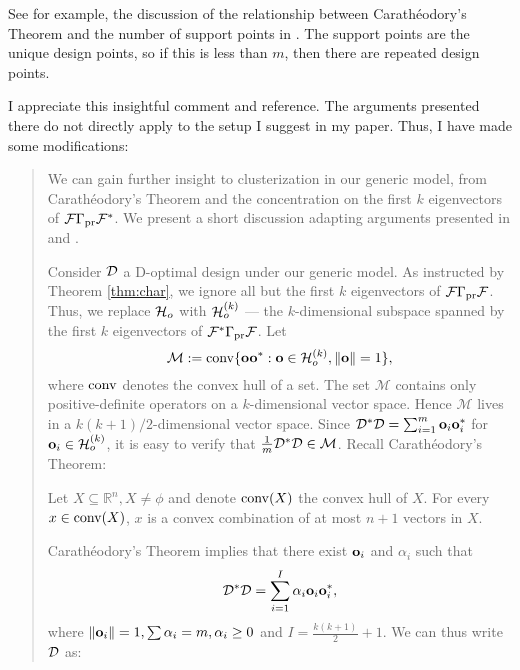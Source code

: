 \RC See for example, the discussion of the relationship between
Carath\'eodory’s Theorem and the number of support points in \cite[page
  139]{pronzatoPazman2013}. The support points are the unique design
points, so if this is less than $m$, then there are repeated design
points.
  
\AR I appreciate this insightful comment and reference. The arguments
presented there do not directly apply to the setup I suggest in my
paper. Thus, I have made some modifications:

\begin{quote} %
  We can gain further insight to clusterization in our generic model,
  from Carath\'eodory's Theorem and the concentration on the first $k$
  eigenvectors of $\mathcal{F} \Gamma_{\textup{pr}} \mathcal{F}^*$. We present a short discussion
  adapting arguments presented in \cite[Chapter 3]{silvey1980} and
  \cite[Section 5.2.3]{pronzatoPazman2013}.

  Consider $\mathcal{D}$ a D-optimal design under our generic model.  As
  instructed by Theorem \ref{thm:char}, we ignore all but the first
  $k$ eigenvectors of $\mathcal{F} \Gamma_{\textup{pr}} \mathcal{F}$. Thus, we replace $\mathcal{H}_o$
  with $\mathcal{H}_o^{(k)}$ --- the $k$-dimensional subspace spanned by the
  first $k$ eigenvectors of $\mathcal{F}^*\Gamma_{\textup{pr}}\mathcal{F}$. Let
  \begin{equation*}
    \mathcal{M} := \operatorname*{conv} \{\mathbf{o} \mathbf{o}^* : \mathbf{o}\in \mathcal{H}_o^{(k)}, \|\mathbf{o}\|=1\},
  \end{equation*}
  where $\operatorname*{conv}$ denotes the convex hull of a set. The set
  $\mathcal{M}$ contains only positive-definite operators on a
  $k$-dimensional vector space. Hence $\mathcal{M}$ lives in a
  $k(k+1)/2$-dimensional vector space. Since $\mathcal{D}^*\mathcal{D} =
  \sum_{i=1}^m \mathbf{o}_i\mathbf{o}_i^*$ for $\mathbf{o}_i \in \mathcal{H}_o^{(k)}$, it is
  easy to verify that $\frac1m \mathcal{D}^*\mathcal{D} \in \mathcal{M}$.  Recall
  Carath\'eodory's Theorem:
  \begin{theorem*}
    Let $X \subseteq \mathbb{R}^n, X \neq \phi$ and denote $\operatorname*{conv} (X)$
    the convex hull of $X$. For every $x \in \operatorname*{conv} (X)$, $x$ is a convex
    combination of at most $n+1$ vectors in $X$.
  \end{theorem*}
  Carath\'eodory's Theorem implies that there exist $\mathbf{o}_i$ and
  $\alpha_i$ such that
  \begin{equation*}
    \mathcal{D}^*\mathcal{D} = \sum_{i=1}^I \alpha_i \mathbf{o}_i\mathbf{o}_i^*,
  \end{equation*}
  where $\|\mathbf{o}_i\|=1, \sum\alpha_i = m, \alpha_i \geq 0$ and $I =
  \frac{k(k+1)}{2} + 1$. We can thus write $\mathcal{D}$ as:
  

\end{quote}
